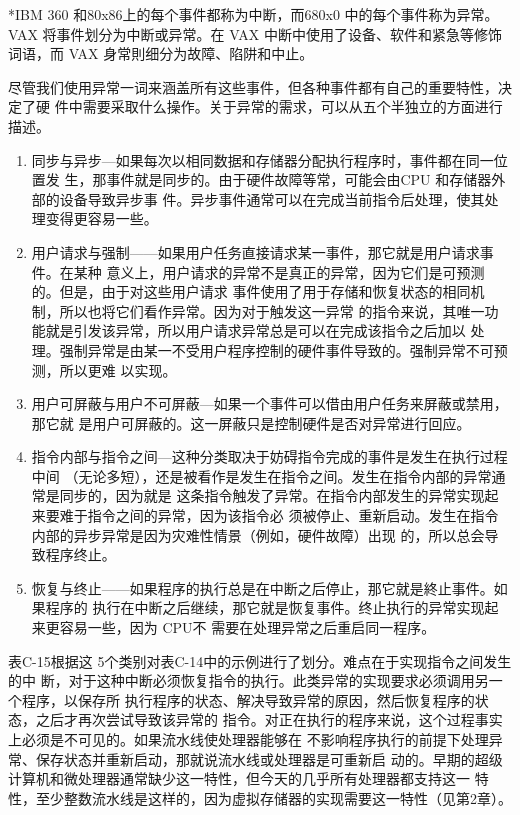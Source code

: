 *IBM 360 和80x86上的每个事件都称为中断，而680x0 中的每个事件称为异常。VAX 将事件划分为中断或异常。在
VAX 中断中使用了设备、软件和紧急等修饰词语，而 VAX 身常則细分为故障、陷阱和中止。

尽管我们使用异常一词来涵盖所有这些事件，但各种事件都有自己的重要特性，决定了硬
件中需要采取什么操作。关于异常的需求，可以从五个半独立的方面进行描述。

\begin{enumerate}
    \item 同步与异步—如果每次以相同数据和存储器分配执行程序时，事件都在同一位置发
    生，那事件就是同步的。由于硬件故障等常，可能会由CPU 和存储器外部的设备导致异步事
    件。异步事件通常可以在完成当前指令后处理，使其处理变得更容易一些。
    
    \item 用户请求与强制——如果用户任务直接请求某一事件，那它就是用户请求事件。在某种
    意义上，用户请求的异常不是真正的异常，因为它们是可预测的。但是，由于对这些用户请求
    事件使用了用于存储和恢复状态的相同机制，所以也将它们看作异常。因为对于触发这一异常
    的指令来说，其唯一功能就是引发该异常，所以用户请求异常总是可以在完成该指令之后加以
    处理。强制异常是由某一不受用户程序控制的硬件事件导致的。强制异常不可预测，所以更难
    以实现。
    
    \item 用户可屏蔽与用户不可屏蔽—如果一个事件可以借由用户任务来屏蔽或禁用，那它就
    是用户可屏蔽的。这一屏蔽只是控制硬件是否对异常进行回应。
    
    \item 指令内部与指令之间—这种分类取决于妨碍指令完成的事件是发生在执行过程中间
    （无论多短），还是被看作是发生在指令之间。发生在指令内部的异常通常是同步的，因为就是
    这条指令触发了异常。在指令内部发生的异常实现起来要难于指令之间的异常，因为该指令必
    须被停止、重新启动。发生在指令内部的异步异常是因为灾难性情景（例如，硬件故障）出现
    的，所以总会导致程序终止。
    
    \item 恢复与终止——如果程序的执行总是在中断之后停止，那它就是終止事件。如果程序的
    执行在中断之后继续，那它就是恢复事件。终止执行的异常实现起来更容易一些，因为 CPU不
    需要在处理异常之后重启同一程序。
\end{enumerate}

表C-15根据这 5个类别对表C-14中的示例进行了划分。难点在于实现指令之间发生的中
断，对于这种中断必须恢复指令的执行。此类异常的实现要求必须调用另一个程序，以保存所
执行程序的状态、解决导致异常的原因，然后恢复程序的状态，之后才再次尝试导致该异常的
指令。对正在执行的程序来说，这个过程事实上必须是不可见的。如果流水线使处理器能够在
不影响程序执行的前提下处理异常、保存状态并重新启动，那就说流水线或处理器是可重新启
动的。早期的超级计算机和微处理器通常缺少这一特性，但今天的几乎所有处理器都支持这一
特性，至少整数流水线是这样的，因为虚拟存储器的实现需要这一特性（见第2章）。

